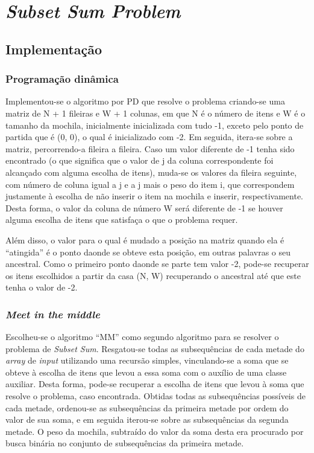 \documentclass{article}[twocolumn]
\begin{document}
	\section{\textit{Subset Sum Problem}}
	\subsection{Implementa\c{c}\~ao}
	\subsubsection{Programa\c{c}\~ao din\^amica}
	Implementou-se o algoritmo por PD que resolve o problema criando-se uma matriz de N + 1
	fileiras e W + 1 colunas, em que N \'e o n\'umero de itens e W \'e o tamanho da mochila,
	inicialmente inicializada com tudo -1, exceto pelo ponto de partida que \'e (0, 0), o qual
	\'e inicializado com -2. Em seguida, itera-se sobre a matriz, percorrendo-a fileira a
	fileira. Caso um valor diferente de -1 tenha sido encontrado (o que significa que o valor
	de j da coluna correspondente foi alcan\c{c}ado com alguma escolha de itens), muda-se
	os valores da fileira seguinte, com n\'umero de coluna igual a j e a j mais o peso do item
	i, que correspondem justamente \`a escolha de n\~ao inserir o item na mochila e inserir,
	respectivamente. Desta forma, o valor da coluna de n\'umero W ser\'a diferente de -1
	se houver alguma escolha de itens que satisfa\c{c}a o que o problema requer.

	Al\'em disso, o valor para o qual \'e mudado a posi\c{c}\~ao na matriz quando ela \'e
	``atingida'' \'e o ponto daonde se obteve esta posi\c{c}\~ao, em outras palavras o seu
	ancestral. Como o primeiro ponto daonde se parte tem valor -2, pode-se recuperar os
	itens escolhidos a partir da casa (N, W) recuperando o ancestral at\'e que este tenha
	o valor de -2.
	
	\subsubsection{\textit{Meet in the middle}}
	Escolheu-se o algoritmo ``MM'' como segundo algoritmo para se resolver o problema de
	\textit{Subset Sum}. Resgatou-se todas as subsequ\^encias de cada metade do \textit{array}
	de \textit{input} utilizando uma recurs\~ao simples, vinculando-se a soma que se obteve
	\`a escolha de itens que levou a essa soma com o aux\'ilio de uma classe auxiliar. Desta
	forma, pode-se recuperar a escolha de itens que levou \`a soma que resolve o problema, caso
	encontrada. Obtidas todas as subsequ\^encias poss\'iveis de cada metade, ordenou-se as
	subsequ\^encias da primeira metade por ordem do valor de sua soma, e em seguida iterou-se
	sobre as subsequ\^encias da segunda metade. O peso da mochila, subtra\'ido do valor
	da soma desta era procurado por busca bin\'aria no conjunto de subsequ\^encias da
	primeira metade.
\end{document}
